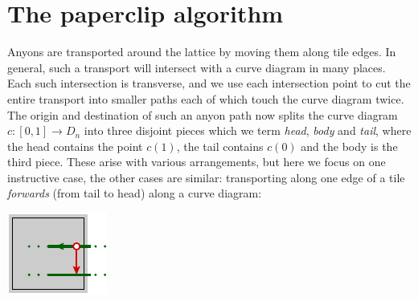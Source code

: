 \documentclass[aps, prl, letterpaper, twocolumn, superscriptaddress, notitlepage, 10pt]{revtex4-1}
\begin{document}
%



%
%

\section{The paperclip algorithm}

Anyons are transported around the lattice
by moving them along tile edges.
In general, such a transport will intersect with a
curve diagram in many places.
Each such intersection is transverse,
and we use each intersection point to cut
the entire transport into smaller paths each of
which touch the curve diagram twice.
The origin and destination of such an anyon path
now splits the curve diagram $c:[0, 1]\to D_n$ 
into three disjoint pieces which we term
\emph{head}, \emph{body} and \emph{tail}, where
the head contains the point $c(1)$, the tail
contains $c(0)$ and the body is the third piece.
These arise with various arrangements, but here
we focus on one instructive case, the
other cases are similar:
transporting along one edge of a tile \emph{forwards} 
(from tail to head) along a curve diagram:
\begin{center}
\includegraphics[]{pic-move-anyon.pdf}
\end{center}
\end{document}
